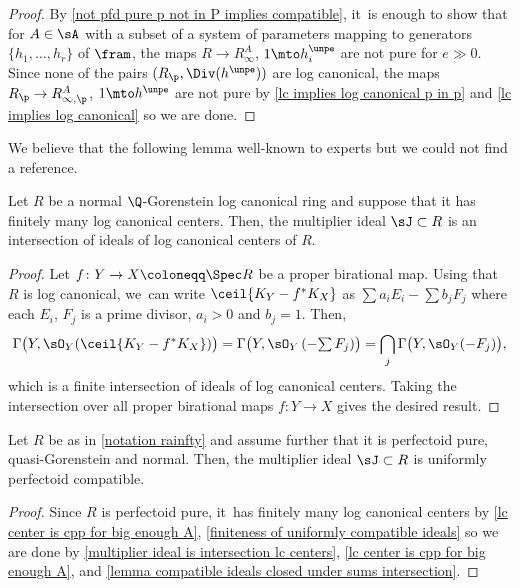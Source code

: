 \begin{proof}
By \autoref{not pfd pure p not in P implies compatible}, it~is enough to show that for $A\in \sA$ with a subset of a system of parameters mapping to generators $\{h_1,\ldots,h_r\}$ of $\fram$, the maps $R\to R^A_{\infty}$, $1\mto h_i^\unpe$ are not pure for $e\gg 0$. Since none of the pairs $(R_\p, \Div(h^{\unpe}))$ are log canonical, the maps $R_\p\to R^A_{\infty,\p}$, $1\mto h^\unpe$ are not pure by \autoref{lc implies log canonical p in p} and \autoref{lc implies log canonical} so we are done.
\end{proof}

We believe that the following lemma well-known to experts but we could not find a reference.
\begin{lemma}\label{multiplier ideal is intersection lc centers}
Let $R$ be a normal $\Q$-Gorenstein log canonical ring and suppose that it has finitely many log canonical centers. Then, the multiplier ideal $\sJ\subset R$ is an intersection of ideals of log canonical centers of $R$.
\end{lemma}

\begin{proof}
Let $f\colon Y\to X\coloneqq \Spec R$ be a proper birational map. Using that $R$ is log canonical, we~can write $\ceil{K_Y-f^* K_X}$ as $\sum a_i E_i - \sum b_j F_j$ where each $E_i$, $F_j$ is a prime divisor,
$a_i>0$ and $b_j=1$. Then,
\[\Gamma\bigl(Y,\sO_Y(\ceil{K_Y-f^* K_X})\bigr)=\Gamma\bigl(Y,\sO_Y\left( - {\textstyle\sum F_j}\right)\bigr)=\bigcap_j \Gamma\bigl(Y,\sO_Y( - F_j)\bigl),
\]
which is a finite intersection of ideals of log canonical centers. Taking the intersection over all proper birational maps $f\colon Y\to X$ gives the desired result.
\end{proof}

\begin{corollary}\label{multiplier ideal uniformly compatible}
Let $R$ be as in \autoref{notation rainfty} and assume further that it is perfectoid pure, quasi-Gorenstein and normal. Then, the multiplier ideal $\sJ\subset R$ is uniformly perfectoid compatible.
\end{corollary}

\begin{proof}
Since $R$ is perfectoid pure, it~has finitely many log canonical centers by \autoref{lc center is cpp for big enough A}, \autoref{finiteness of uniformly compatible ideals} so we are done by \autoref{multiplier ideal is intersection lc centers}, \autoref{lc center is cpp for big enough A}, and \autoref{lemma compatible ideals closed under sums intersection}.
\end{proof}

